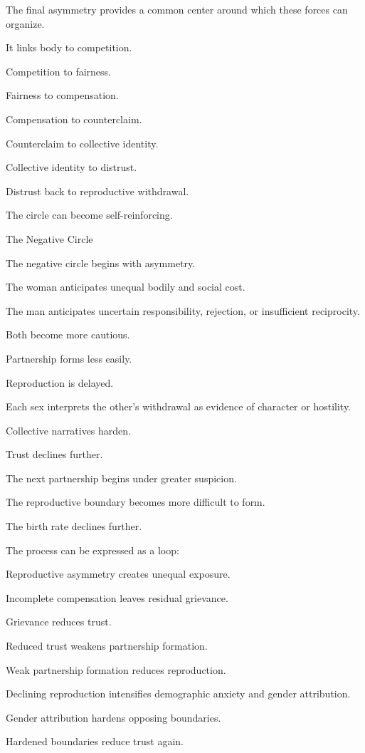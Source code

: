 The final asymmetry provides a common center around which these forces can organize.

It links body to competition.

Competition to fairness.

Fairness to compensation.

Compensation to counterclaim.

Counterclaim to collective identity.

Collective identity to distrust.

Distrust back to reproductive withdrawal.

The circle can become self-reinforcing.

The Negative Circle

The negative circle begins with asymmetry.

The woman anticipates unequal bodily and social cost.

The man anticipates uncertain responsibility, rejection, or insufficient reciprocity.

Both become more cautious.

Partnership forms less easily.

Reproduction is delayed.

Each sex interprets the other’s withdrawal as evidence of character or hostility.

Collective narratives harden.

Trust declines further.

The next partnership begins under greater suspicion.

The reproductive boundary becomes more difficult to form.

The birth rate declines further.

The process can be expressed as a loop:

Reproductive asymmetry creates unequal exposure.

Incomplete compensation leaves residual grievance.

Grievance reduces trust.

Reduced trust weakens partnership formation.

Weak partnership formation reduces reproduction.

Declining reproduction intensifies demographic anxiety and gender attribution.

Gender attribution hardens opposing boundaries.

Hardened boundaries reduce trust again.


